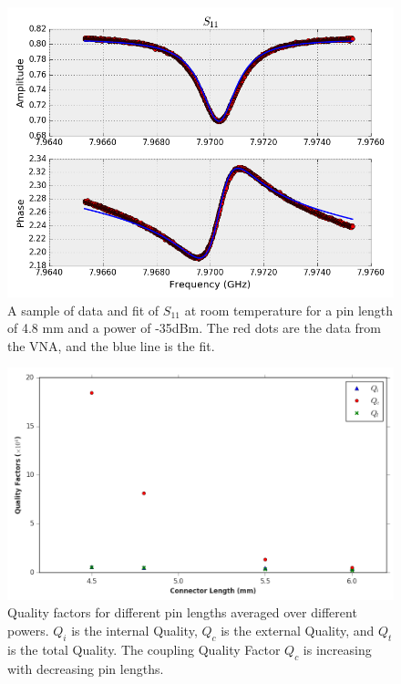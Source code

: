 \begin{figure}
\centering
\includegraphics[width=\linewidth]{Figures/s11fitroom.png}
\decoRule
\caption[Sample Room Temperature Fit]{A sample of data and fit of $S_{11}$ at room temperature for a pin length of 4.8 mm and a power of -35dBm. The red dots are the data from the VNA, and the blue line is the fit.}
\label{fig:room fit}
\end{figure}

\begin{figure}
\centering
\includegraphics[width=\linewidth]{Figures/diff_lengths.png}
\decoRule
\caption[Quality Factors for different pin lengths]{Quality factors for different pin lengths averaged over different powers. $Q_i$ is the internal Quality, $Q_c$ is the external Quality, and $Q_t$ is the total Quality. The coupling Quality Factor $Q_c$ is increasing with decreasing pin lengths.}
\label{fig:diff lengths}
\end{figure}

